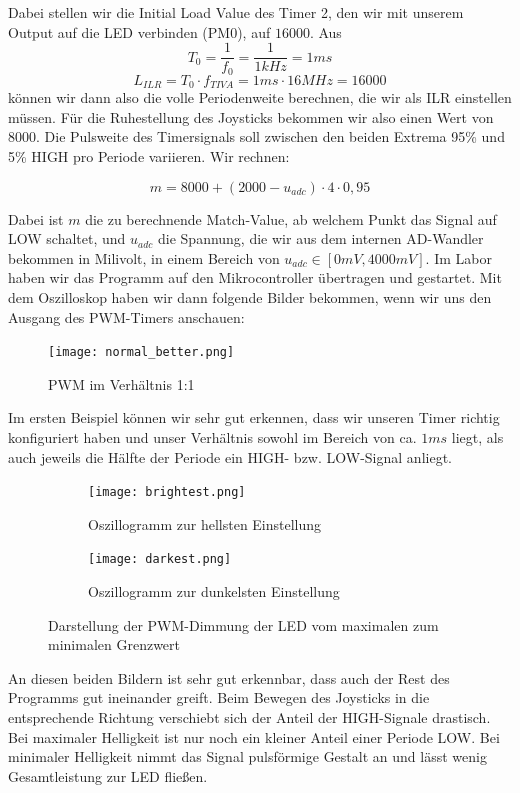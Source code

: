 \documentclass{article}
\begin{document}
Dabei stellen wir die Initial Load Value des Timer 2, den wir mit unserem Output auf die LED verbinden (PM0), auf $16000$. Aus
\[ T_{0} = \frac{1}{f_{0}} = \frac{1}{1kHz} = 1ms \]
\[ L_{ILR} = T_{0} \cdot f_{TIVA} = 1ms \cdot 16MHz = 16000\]
können wir dann also die volle Periodenweite berechnen, die wir als ILR einstellen müssen. Für die Ruhestellung des Joysticks bekommen wir also einen Wert von $8000$. Die Pulsweite des Timersignals soll zwischen den beiden Extrema 95\% und 5\% HIGH pro Periode variieren. Wir rechnen:

\[m = 8000 + (2000 - u_{adc}) \cdot 4 \cdot 0,95\]

Dabei ist $m$ die zu berechnende Match-Value, ab welchem Punkt das Signal auf LOW schaltet, und $u_{adc}$ die Spannung, die wir aus dem internen AD-Wandler bekommen in Milivolt, in einem Bereich von $u_{adc} \in [0mV, 4000mV]$. Im Labor haben wir das Programm auf den Mikrocontroller übertragen und gestartet. Mit dem Oszilloskop haben wir dann folgende Bilder bekommen, wenn wir uns den Ausgang des PWM-Timers anschauen:

\begin{figure}[h]
  \centering
  \texttt{[image: normal\_better.png]}
  \caption{PWM im Verhältnis 1:1}
  \label{fig:normal}
\end{figure}

Im ersten Beispiel können wir sehr gut erkennen, dass wir unseren Timer richtig konfiguriert haben und unser Verhältnis sowohl im Bereich von ca. $1ms$ liegt, als auch jeweils die Hälfte der Periode ein HIGH- bzw. LOW-Signal anliegt.


\begin{figure}[h]
  \centering
  \begin{subfigure}{.45\textwidth}
    \centering
    \texttt{[image: brightest.png]}
    \caption{Oszillogramm zur hellsten Einstellung}
  \end{subfigure}
  \begin{subfigure}{.45\textwidth}
    \centering
    \texttt{[image: darkest.png]}
    \caption{Oszillogramm zur dunkelsten Einstellung}
  \end{subfigure}
  \label{fig:bright_dark}
  \caption{Darstellung der PWM-Dimmung der LED vom maximalen zum minimalen Grenzwert}
\end{figure}

An diesen beiden Bildern ist sehr gut erkennbar, dass auch der Rest des Programms gut ineinander greift. Beim Bewegen des Joysticks in die entsprechende Richtung verschiebt sich der Anteil der HIGH-Signale drastisch. Bei maximaler Helligkeit ist nur noch ein kleiner Anteil einer Periode LOW. Bei minimaler Helligkeit nimmt das Signal pulsförmige Gestalt an und lässt wenig Gesamtleistung zur LED fließen.
\end{document}
